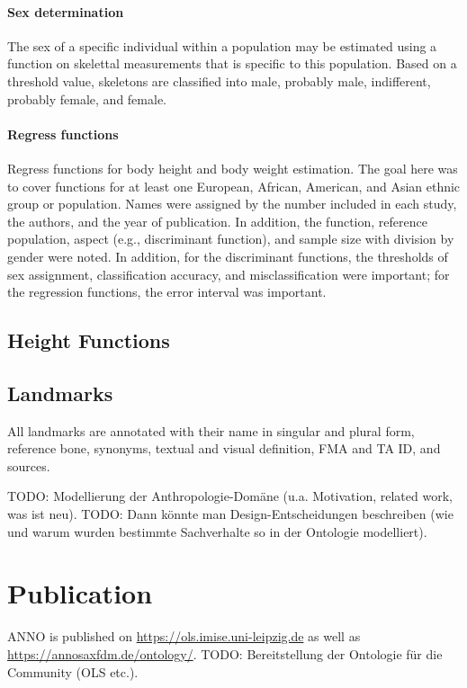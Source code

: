 \documentclass[sw]{iosart2x}
\begin{document}
\paragraph{Sex determination}
The sex of a specific individual within a population may be estimated using a function on skelettal measurements that is specific to this population.
Based on a threshold value, skeletons are classified into male, probably male, indifferent, probably female, and female.

\paragraph{Regress functions}
Regress functions for body height and body weight estimation. The goal here was to cover functions for at least one European, African, American, and Asian ethnic group or population. Names were assigned by the number included in each study, the authors, and the year of publication. In addition, the function, reference population, aspect (e.g., discriminant function), and sample size with division by gender were noted. In addition, for the discriminant functions, the thresholds of sex assignment, classification accuracy, and misclassification were important; for the regression functions, the error interval was important.

\subsection{Height Functions}
\subsection{Landmarks}
All landmarks are annotated with their name in singular and plural form, reference bone, synonyms, textual and visual definition, FMA and TA ID, and sources.

TODO: Modellierung der Anthropologie-Domäne (u.a. Motivation, related work, was ist neu).
TODO: Dann könnte man Design-Entscheidungen beschreiben (wie und warum wurden bestimmte Sachverhalte so in der Ontologie modelliert).
\section{Publication}
ANNO is published on \url{https://ols.imise.uni-leipzig.de} as well as \url{https://annosaxfdm.de/ontology/}.
TODO: Bereitstellung der Ontologie für die Community (OLS etc.). 
\end{document}
